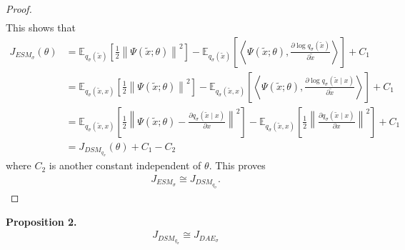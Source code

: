 \documentclass[10pt]{article}
\newcommand{\EE}{\mathbb{E}}
\newcommand{\inner}[2]{\left\langle #1, #2 \right\rangle}
\newcommand{\DAE}{J_{DAE_\sigma}}
\newcommand{\ESMP}{J_{ESM_\sigma}}
\newcommand{\DSM}{J_{DSM_{q_\sigma}}}
\begin{document}
\begin{proof}
\begin{align*}
\end{align*}
This shows that
\begin{align*}
\ESMP(\theta) &= \EE_{q_\sigma(\tilde{x})} \left[ \frac{1}{2} \left\| \Psi(\tilde{x};\theta) \right\|^2 \right] - \EE_{q_\sigma(\tilde{x})} \left[ \inner{\Psi(\tilde{x};\theta)}{\frac{\partial \log q_\sigma(\tilde{x})}{\partial \tilde{x}}} \right] + C_1 \\
&= \EE_{q_\sigma(\tilde{x},x)} \left[ \frac{1}{2} \left\| \Psi(\tilde{x};\theta) \right\|^2 \right] - \EE_{q_\sigma(\tilde{x},x)} \left[ \inner{\Psi(\tilde{x};\theta)}{\frac{\partial \log q_\sigma(\tilde{x} \mid x)}{\partial \tilde{x}}} \right] + C_1 \\
&= \EE_{q_\sigma(\tilde{x},x)} \left[ \frac{1}{2} \left\| \Psi(\tilde{x};\theta) - \frac{\partial q_\sigma(\tilde{x} \mid x)}{\partial x} \right\|^2 \right] - \EE_{q_\sigma(\tilde{x},x)} \left[ \frac{1}{2} \left\| \frac{\partial q_\sigma(\tilde{x} \mid x)}{\partial x} \right\|^2 \right] + C_1 \\
&= \DSM(\theta) + C_1 - C_2
\end{align*}
where $C_2$ is another constant independent of $\theta$. This proves
\begin{align*}
\ESMP \cong \DSM.
\end{align*}
\end{proof}

\newpage

\textbf{Proposition 2.}
\begin{align*}
\DSM \cong \DAE
\end{align*}
\end{document}
